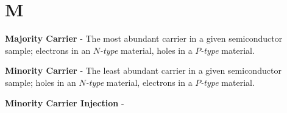 \section{M}
    \textbf{Majority Carrier} - The most abundant carrier in a given semiconductor sample; electrons in an $N$\emph{-type} material, holes in a $P$\emph{-type} material.

\vspace{0.5cm}
\noindent
    \textbf{Minority Carrier} - The least abundant carrier in a given semiconductor sample; holes in an $N$\emph{-type} material, electrons in a $P$\emph{-type} material.

\vspace{0.5cm}
\noindent
    \textbf{Minority Carrier Injection} -

